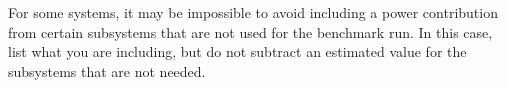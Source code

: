 \begin{itemize}
For some systems, it may be impossible to avoid including a power contribution from certain subsystems that are not used for the benchmark run.
In this case, list what you are including, but do not subtract an estimated value for the subsystems that are not needed.








\end{itemize}
